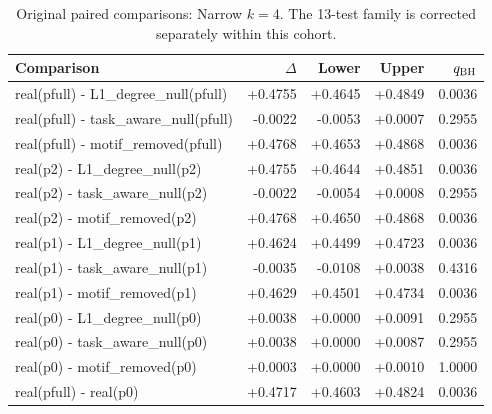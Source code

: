 \begin{table}[H]\centering
\caption{Original paired comparisons: Narrow $k=4$. The 13-test family is corrected separately within this cohort.}\small
\begin{tabular}{lrrrr}\toprule
Comparison & $\Delta$ & Lower & Upper & $q_{\rm BH}$ \\ \midrule
real(pfull) - L1\_degree\_null(pfull) & +0.4755 & +0.4645 & +0.4849 & 0.0036 \\
real(pfull) - task\_aware\_null(pfull) & -0.0022 & -0.0053 & +0.0007 & 0.2955 \\
real(pfull) - motif\_removed(pfull) & +0.4768 & +0.4653 & +0.4868 & 0.0036 \\
real(p2) - L1\_degree\_null(p2) & +0.4755 & +0.4644 & +0.4851 & 0.0036 \\
real(p2) - task\_aware\_null(p2) & -0.0022 & -0.0054 & +0.0008 & 0.2955 \\
real(p2) - motif\_removed(p2) & +0.4768 & +0.4650 & +0.4868 & 0.0036 \\
real(p1) - L1\_degree\_null(p1) & +0.4624 & +0.4499 & +0.4723 & 0.0036 \\
real(p1) - task\_aware\_null(p1) & -0.0035 & -0.0108 & +0.0038 & 0.4316 \\
real(p1) - motif\_removed(p1) & +0.4629 & +0.4501 & +0.4734 & 0.0036 \\
real(p0) - L1\_degree\_null(p0) & +0.0038 & +0.0000 & +0.0091 & 0.2955 \\
real(p0) - task\_aware\_null(p0) & +0.0038 & +0.0000 & +0.0087 & 0.2955 \\
real(p0) - motif\_removed(p0) & +0.0003 & +0.0000 & +0.0010 & 1.0000 \\
real(pfull) - real(p0) & +0.4717 & +0.4603 & +0.4824 & 0.0036 \\
\bottomrule\end{tabular}\end{table}
